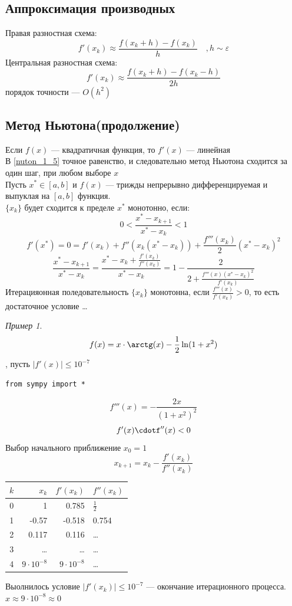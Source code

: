 \documentclass[oneside]{book}
\theoremstyle{plain}
\theoremstyle{remark}
\newtheorem*{examp}{Пример}
\theoremstyle{definition}
\begin{document}
\subsection{Аппроксимация производных}
\label{sec:orgc8181f5}
Правая разностная схема:
\[ f'(x_k) \approx \frac{f(x_k + h) - f(x_k)}{h}\quad ,h \sim \varepsilon \]
Центральная разностная схема:
\[ f'(x_k) \approx \frac{f(x_k + h) - f(x_k - h)}{2h} \]
порядок точности --- \(O(h^2)\)
\subsection{Метод Ньютона(продолжение)}
\label{sec:org21efb81}
Если \(f(x)\) --- квадратичная функция, то \(f'(x)\) --- линейная \\
В \ref{nuton_1_5} точное равенство, и следовательно метод Ньютона
сходится за один шаг, при любом выборе \(x\) \\
Пусть \(x^* \in [a, b]\) и \(f(x)\) --- трижды непрерывно дифференцируемая и выпуклая на \([a, b]\) функция. \\
\(\{x_k\}\) будет сходится к пределе \(x^*\) монотонно, если:
\[ 0<\frac{x^* - x_{k+1}}{x^* - x_k} < 1 \]
\[ f'(x^*) = 0 = f'(x_k) + f''(x_k(x^* - x_k)) + \frac{f'''(x_k)}{2}(x^* - x_k)^2 \]
\[ \frac{x^* - x_{k + 1}}{x^* - x_k} = \frac{x^* - x_k + \frac{f'(x_k)}{f''(x_k)}}{x^* - x_k} = 1 - \frac{2}{2 + \frac{f'''(x)(x^* - x_k)^2}{f'(x_k)}}\]
Итерацияонная поледовательность \(\{x_k\}\) монотонна, если \(\frac{f'''(x)}{f'(x_k)} > 0\),
то есть достаточное условие \color{red}\dots{}\color{black}

\begin{examp}
\[ f(x) = x\cdot\arctg(x) - \frac{1}{2}\ln(1 + x^2) \]
, пусть \(|f'(x)| \le 10^{-7}\)
\begin{verbatim}
from sympy import *
\end{verbatim}

\[ f'''(x) = -\frac{2x}{(1 + x^2)^2} \]
\[ f'(x)\cdotf''(x) < 0 \]
Выбор начального приближение \(x_0 = 1\)
\[ x_{k + 1} = x_k - \frac{f'(x_k)}{f''(x_k)} \]
\begin{center}
\begin{tabular}{r|rrl|}
\(k\) & \(x_k\) & \(f'(x_k)\) & \(f''(x_k)\)\\
\hline
0 & 1 & 0.785 & \(\frac{1}{2}\)\\
1 & -0.57 & -0.518 & 0.754\\
2 & 0.117 & 0.116 & \dots{}\\
3 & \dots{} & \dots{} & \dots{}\\
4 & \(9\cdot 10^{-8}\) & \(9\cdot10^{-8}\) & \dots{}\\
\end{tabular}
\end{center}
Выолнилось условие \(|f'(x_k)| \le 10^{-7}\) --- окончание итерационного процесса. \(x \approx 9\cdot 10^{-8} \approx 0\)
\end{examp}
\end{document}
